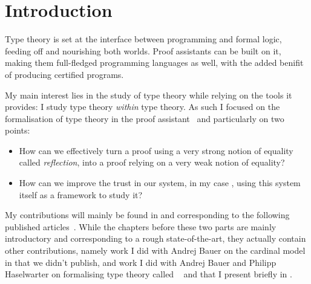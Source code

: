 \chapter{Introduction}

Type theory is set at the interface between programming and formal logic,
feeding off and nourishing both worlds. Proof assistants can be built on it,
making them full-fledged programming languages as well, with the added benifit
of producing certified programs.

My main interest lies in the study of type theory while relying on the tools it
provides: I study type theory \emph{within} type theory.
As such I focused on the formalisation of type theory in the \Coq proof
assistant~ and particularly on two points:
\begin{itemize}
  \item How can we effectively turn a proof using a very strong notion of
  equality called \emph{reflection}, into a proof relying on a very weak notion
  of equality?
  \item How can we improve the trust in our system, in my case \Coq, using this
  system itself as a framework to study it?
\end{itemize}

My contributions will mainly be found in  and
 corresponding to the following published
articles~.
While the chapters before these two parts are mainly introductory and
corresponding to a rough state-of-the-art, they actually contain other
contributions, namely work I did with Andrej Bauer on the cardinal model
in  that we didn't publish, and work I did with Andrej Bauer
and Philipp Haselwarter on formalising type theory called
\ftt~ and that I present briefly in
.